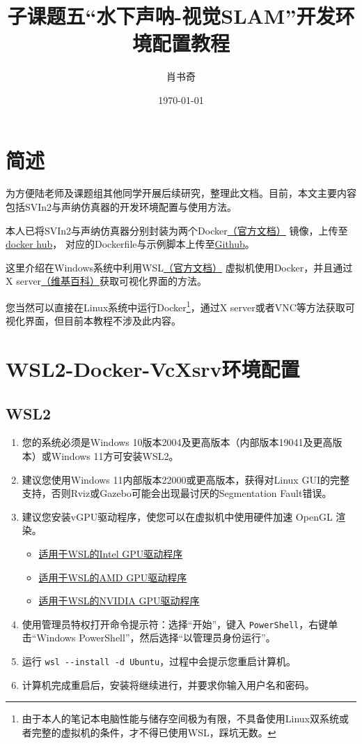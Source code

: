 \documentclass[UTF8,zhmap=true,fontset=none,zihao=-4,heading=false,scheme=chinese]{ctexart}
\title{子课题五``水下声呐-视觉SLAM''开发环境配置教程}
\author{肖书奇}
\date{\today}
\begin{document}
\maketitle
\section{简述}
\par 为方便陆老师及课题组其他同学开展后续研究，整理此文档。目前，本文主要内容包括SVIn2与声纳仿真器的开发环境配置与使用方法。
\par 本人已将SVIn2与声纳仿真器分别封装为两个Docker\href{https://docs.docker.com/}{（官方文档）} 镜像，上传至\href{https://hub.docker.com/u/xiaosq2000}{docker hub}，
对应的Dockerfile与示例脚本上传至\href{https://github.com/xiaosq2000/SVI-SLAM}{Github}。
\par 这里介绍在Windows系统中利用WSL\href{https://docs.microsoft.com/en-us/windows/wsl/}{（官方文档）} 虚拟机使用Docker，并且通过X server\href{https://en.wikipedia.org/wiki/X_Window_System}{（维基百科）}获取可视化界面的方法。
\par 您当然可以直接在Linux系统中运行Docker\footnote{由于本人的笔记本电脑性能与储存空间极为有限，不具备使用Linux双系统或者完整的虚拟机的条件，才不得已使用WSL，踩坑无数。}，通过X server或者VNC等方法获取可视化界面，但目前本教程不涉及此内容。
\section{WSL2-Docker-VcXsrv环境配置}
\subsection{WSL2}
\begin{enumerate}
    \item 您的系统必须是Windows 10版本2004及更高版本（内部版本19041及更高版本）或Windows 11方可安装WSL2。
    \item 建议您使用Windows 11内部版本22000或更高版本，获得对Linux GUI的完整支持，否则Rviz或Gazebo可能会出现最讨厌的Segmentation Fault错误。
    \item 建议您安装vGPU驱动程序，使您可以在虚拟机中使用硬件加速 OpenGL 渲染。
    \begin{itemize}
        \item \href{https://www.intel.com/content/www/us/en/download/19344/intel-graphics-windows-10-windows-11-dch-drivers.html}{适用于WSL的Intel GPU驱动程序}
        \item \href{https://www.amd.com/en/support/kb/release-notes/rn-rad-win-wsl-support}{适用于WSL的AMD GPU驱动程序}
        \item \href{https://developer.nvidia.com/cuda/wsl}{适用于WSL的NVIDIA GPU驱动程序}
    \end{itemize}
    \item 使用管理员特权打开命令提示符：选择“开始”，键入 \verb|PowerShell|，右键单击``Windows PowerShell''，然后选择``以管理员身份运行''。
    \item 运行 \verb|wsl --install -d Ubuntu|，过程中会提示您重启计算机。
    \item 计算机完成重启后，安装将继续进行，并要求你输入用户名和密码。
\end{enumerate}
\end{document}
